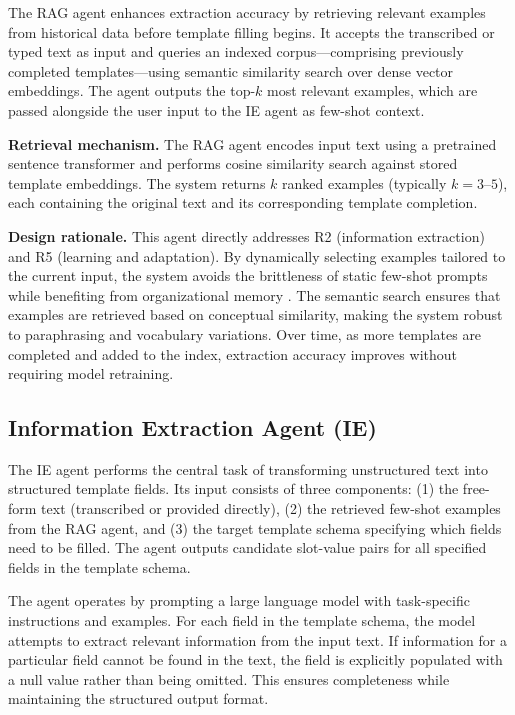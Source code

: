 The RAG agent enhances extraction accuracy by retrieving relevant examples from historical data before template filling begins. It accepts the transcribed or typed text as input and queries an indexed corpus—comprising previously completed templates—using semantic similarity search over dense vector embeddings. The agent outputs the top-$k$ most relevant examples, which are passed alongside the user input to the IE agent as few-shot context.

\textbf{Retrieval mechanism.} The RAG agent encodes input text using a pretrained sentence transformer and performs cosine similarity search against stored template embeddings. The system returns $k$ ranked examples (typically $k = 3$–$5$), each containing the original text and its corresponding template completion.

\textbf{Design rationale.} This agent directly addresses R2 (information extraction) and R5 (learning and adaptation). By dynamically selecting examples tailored to the current input, the system avoids the brittleness of static few-shot prompts while benefiting from organizational memory \cite{mialon2023augmented}. The semantic search ensures that examples are retrieved based on conceptual similarity, making the system robust to paraphrasing and vocabulary variations. Over time, as more templates are completed and added to the index, extraction accuracy improves without requiring model retraining.

\subsection{Information Extraction Agent (IE)}
\label{subsec:ie-agent}

The IE agent performs the central task of transforming unstructured text into structured template fields. Its input consists of three components: (1) the free-form text (transcribed or provided directly), (2) the retrieved few-shot examples from the RAG agent, and (3) the target template schema specifying which fields need to be filled. The agent outputs candidate slot-value pairs for all specified fields in the template schema.

The agent operates by prompting a large language model with task-specific instructions and examples. For each field in the template schema, the model attempts to extract relevant information from the input text. If information for a particular field cannot be found in the text, the field is explicitly populated with a null value rather than being omitted. This ensures completeness while maintaining the structured output format.

